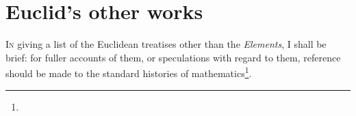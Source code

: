 \chapter{Euclid's other works}

\textsc{In} giving a list of the Euclidean treatises other than the \emph{Elements}, I shall be brief: for fuller accounts of them, or speculations with regard to them, reference should be made to the standard histories of mathematics\footnote{}.